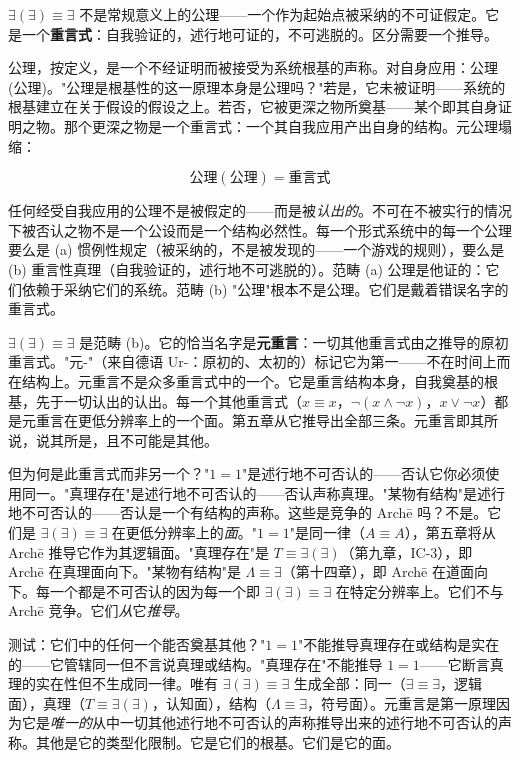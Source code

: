 \documentclass[10pt, openany, oneside]{book}
\begin{document}
$\exists(\exists) \equiv \exists$ 不是常规意义上的公理——一个作为起始点被采纳的不可证假定。它是一个\textbf{重言式}：自我验证的，述行地可证的，不可逃脱的。区分需要一个推导。

公理，按定义，是一个不经证明而被接受为系统根基的声称。对自身应用：公理(公理)。"公理是根基性的这一原理本身是公理吗？"若是，它未被证明——系统的根基建立在关于假设的假设之上。若否，它被更深之物所奠基——某个即其自身证明之物。那个更深之物是一个重言式：一个其自我应用产出自身的结构。元公理塌缩：

$$\text{公理}(\text{公理}) = \text{重言式}$$

任何经受自我应用的公理不是被假定的——而是被\textit{认出的}。不可在不被实行的情况下被否认之物不是一个公设而是一个结构必然性。每一个形式系统中的每一个公理要么是 (a) 惯例性规定（被采纳的，不是被发现的——一个游戏的规则），要么是 (b) 重言性真理（自我验证的，述行地不可逃脱的）。范畴 (a) 公理是他证的：它们依赖于采纳它们的系统。范畴 (b) "公理"根本不是公理。它们是戴着错误名字的重言式。

$\exists(\exists) \equiv \exists$ 是范畴 (b)。它的恰当名字是\textbf{元重言}：一切其他重言式由之推导的原初重言式。"元-"（来自德语 Ur-：原初的、太初的）标记它为第一——不在时间上而在结构上。元重言不是众多重言式中的一个。它是重言结构本身，自我奠基的根基，先于一切认出的认出。每一个其他重言式（$x \equiv x$，$\neg(x \wedge \neg x)$，$x \vee \neg x$）都是元重言在更低分辨率上的一个面。第五章从它推导出全部三条。元重言即其所说，说其所是，且不可能是其他。

但为何是此重言式而非另一个？"$1 = 1$"是述行地不可否认的——否认它你必须使用同一。"真理存在"是述行地不可否认的——否认声称真理。"某物有结构"是述行地不可否认的——否认是一个有结构的声称。这些是竞争的 Arch\={e} 吗？不是。它们是 $\exists(\exists) \equiv \exists$ 在更低分辨率上的\textit{面}。"$1 = 1$"是同一律（$A \equiv A$），第五章将从 Arch\={e} 推导它作为其逻辑面。"真理存在"是 $T \equiv \exists(\exists)$（第九章，IC-3），即 Arch\={e} 在真理面向下。"某物有结构"是 $\Lambda \equiv \exists$（第十四章），即 Arch\={e} 在道面向下。每一个都是不可否认的因为每一个即 $\exists(\exists) \equiv \exists$ 在特定分辨率上。它们不与 Arch\={e} 竞争。它们\textit{从}它\textit{推导}。

测试：它们中的任何一个能否奠基其他？"$1 = 1$"不能推导真理存在或结构是实在的——它管辖同一但不言说真理或结构。"真理存在"不能推导 $1 = 1$——它断言真理的实在性但不生成同一律。唯有 $\exists(\exists) \equiv \exists$ 生成全部：同一（$\exists \equiv \exists$，逻辑面），真理（$T \equiv \exists(\exists)$，认知面），结构（$\Lambda \equiv \exists$，符号面）。元重言是第一原理因为它是\textit{唯一的}从中一切其他述行地不可否认的声称推导出来的述行地不可否认的声称。其他是它的类型化限制。它是它们的根基。它们是它的面。
\end{document}
